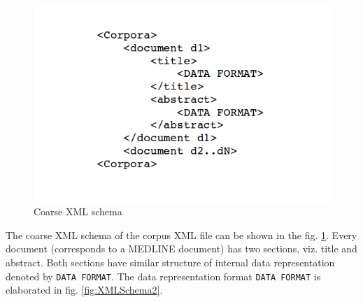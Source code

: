 \begin{enumerate}
\begin{figure}
\centering
\includegraphics[scale=0.4]{figures/XMLSchema1.png}
\caption{Coarse XML schema}\label{fig:XMLSchema1}
\end{figure}

The coarse XML schema of the corpus XML file can be shown in the fig. \ref{fig:XMLSchema1}. Every document (corresponds to a MEDLINE document) has two sections, viz. title and abstract. Both sections have similar structure of internal data representation denoted by \texttt{DATA FORMAT}. The data representation format \texttt{DATA FORMAT} is elaborated in fig. \ref{fig:XMLSchema2}.


\end{enumerate}
